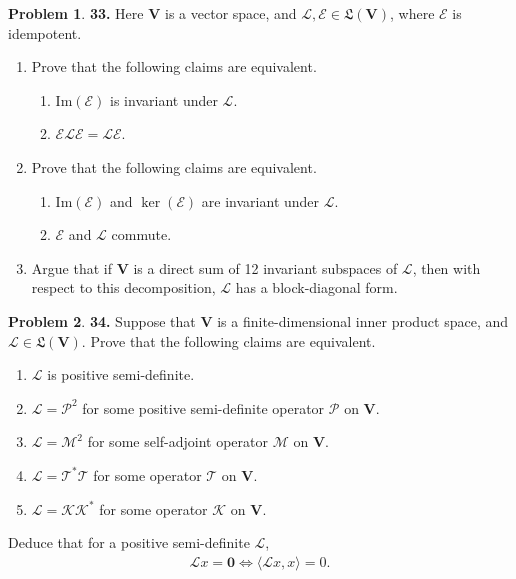 \documentclass{article}
\theoremstyle{definition}
\newtheorem*{prob*}{Problem}
\newcommand{\V}{\mathbf{V}}
\newcommand{\lag}{\mathcal{L}}
\newcommand{\M}{\mathcal{M}}
\newcommand{\K}{\mathcal{K}}
\newcommand{\E}{\mathcal{E}}
\newcommand{\ima}{\text{Im}}
\newcommand{\T}{\mathcal{T}}
\newcommand{\LL}{\mathfrak{L}}
\newcommand{\la}{\langle}
\newcommand{\ra}{\rangle}
\begin{document}
\newpage




\begin{prob*}\textbf{33.} Here $\V$ is a vector space, and $\lag, \E \in \LL(\V)$, where $\E$ is idempotent.
	\begin{enumerate}
		\item Prove that the following claims are equivalent.
		\begin{enumerate}
			\item $\ima(\E)$ is invariant under $\lag$.
			\item $\E\lag\E = \lag \E$.
		\end{enumerate}
	
	
		\item Prove that the following claims are equivalent.
		\begin{enumerate}
			\item $\ima(\E)$ and $\ker(\E)$ are invariant under $\lag$.
			\item $\E$ and $\lag$ commute.
		\end{enumerate}
	
	
		\item Argue that if $\V$ is a direct sum of 12 invariant subspaces of $\lag$, then with respect to this decomposition, $\lag$ has a block-diagonal form.
	\end{enumerate}
	
\end{prob*}


\newpage




\begin{prob*}\textbf{34.} Suppose that $\V$ is a finite-dimensional inner product space, and $\lag \in \LL(\V)$. Prove that the following claims are equivalent.
	\begin{enumerate}
		\item $\lag$ is positive semi-definite.
		\item $\lag = \mathcal{P}^2$ for some positive semi-definite operator $\mathcal{P}$ on $\V$.
		\item $\lag= \M^2$ for some self-adjoint operator $\M$ on $\V$.
		\item $\lag = \T^*\T$ for some operator $\T$ on $\V$.
		\item $\lag = \K\K^*$ for some operator $\K$ on $\V$.
	\end{enumerate}
	
	Deduce that for a positive semi-definite $\lag$,
	\begin{align*}
	\lag x = \mathbf{0} \iff \la \lag x,x\ra= 0.
	\end{align*}
	
\end{prob*}
\end{document}
